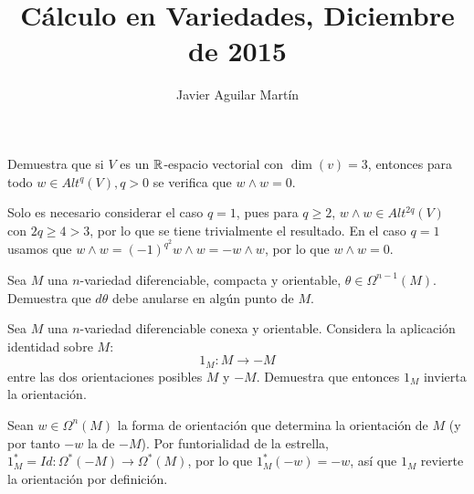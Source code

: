 \documentclass[twoside]{article}
\begin{document}
\title{Cálculo en Variedades, Diciembre de 2015}
\author{Javier Aguilar Martín}
\maketitle


\begin{ejercicio}{1}
Demuestra que si $V$ es un $\mathbb{R}$-espacio vectorial con $\dim(v)=3$, entonces para todo $w\in Alt^q(V), q>0$ se verifica que $w\land w=0$.
\end{ejercicio}
\begin{solucion}
Solo es necesario considerar el caso $q=1$, pues para $q\geq 2$, $w\land w\in Alt^{2q}(V)$ con $2q\geq 4>3$, por lo que se tiene trivialmente el resultado. En el caso $q=1$ usamos que $w\land w=(-1)^{q^2}w\land w=-w\land w$, por lo que $w\land w=0$.


\end{solucion}

\newpage

\begin{ejercicio}{2}
Sea $M$ una $n$-variedad diferenciable, compacta y orientable, $\theta\in\Omega^{n-1}(M)$. Demuestra que $d\theta$ debe anularse en algún punto de $M$.
\end{ejercicio}
\begin{solucion}

\end{solucion}
\newpage

\begin{ejercicio}{3}
Sea $M$ una $n$-variedad diferenciable conexa y orientable. Considera la aplicación identidad sobre $M$:
\[
1_M:M\to -M
\]
entre las dos orientaciones posibles $M$ y $-M$. Demuestra que entonces $1_M$ invierta la orientación.
\end{ejercicio}
\begin{solucion}
Sean $w\in\Omega^n(M)$ la forma de orientación que determina la orientación de $M$ (y por tanto $-w$ la de $-M$). Por funtorialidad de la estrella, $1_M^*=Id:\Omega^*(-M)\to\Omega^*(M)$, por lo que $1_M^*(-w)=-w$, así que $1_M$ revierte la orientación por definición.
\end{solucion}
\newpage
\end{document}
